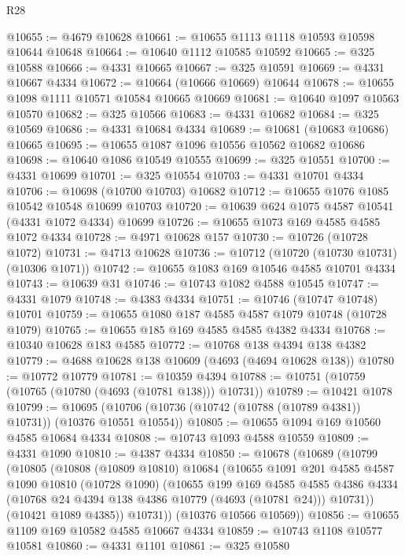 \begin{lexlean}{R28}
\begin{coremodule}
@10655 := @4679 @10628
@10661 := @10655 @1113 @1118 @10593 @10598 @10644 @10648
@10664 := @10640 @1112 @10585 @10592
@10665 := @325 @10588
@10666 := @4331 @10665
@10667 := @325 @10591
@10669 := @4331 @10667 @4334
@10672 := @10664 (@10666 @10669) @10644
@10678 := @10655 @1098 @1111 @10571 @10584 @10665 @10669
@10681 := @10640 @1097 @10563 @10570
@10682 := @325 @10566
@10683 := @4331 @10682
@10684 := @325 @10569
@10686 := @4331 @10684 @4334
@10689 := @10681 (@10683 @10686) @10665
@10695 := @10655 @1087 @1096 @10556 @10562 @10682 @10686
@10698 := @10640 @1086 @10549 @10555
@10699 := @325 @10551
@10700 := @4331 @10699
@10701 := @325 @10554
@10703 := @4331 @10701 @4334
@10706 := @10698 (@10700 @10703) @10682
@10712 := @10655 @1076 @1085 @10542 @10548 @10699 @10703
@10720 := @10639 @624 @1075 @4587 @10541 (@4331 @1072 @4334) @10699
@10726 := @10655 @1073 @169 @4585 @4585 @1072 @4334
@10728 := @4971 @10628 @157
@10730 := @10726 (@10728 @1072)
@10731 := @4713 @10628
@10736 := @10712 (@10720 (@10730 @10731) (@10306 @1071))
@10742 := @10655 @1083 @169 @10546 @4585 @10701 @4334
@10743 := @10639 @31
@10746 := @10743 @1082 @4588 @10545
@10747 := @4331 @1079
@10748 := @4383 @4334
@10751 := @10746 (@10747 @10748) @10701
@10759 := @10655 @1080 @187 @4585 @4587 @1079 @10748 (@10728 @1079)
@10765 := @10655 @185 @169 @4585 @4585 @4382 @4334
@10768 := @10340 @10628 @183 @4585
@10772 := @10768 @138 @4394 @138 @4382
@10779 := @4688 @10628 @138 @10609 (@4693 (@4694 @10628 @138))
@10780 := @10772 @10779
@10781 := @10359 @4394
@10788 := @10751 (@10759 (@10765 (@10780 (@4693 (@10781 @138))) @10731))
@10789 := @10421 @1078
@10799 := @10695 (@10706 (@10736 (@10742 (@10788 (@10789 @4381)) @10731)) (@10376 @10551 @10554))
@10805 := @10655 @1094 @169 @10560 @4585 @10684 @4334
@10808 := @10743 @1093 @4588 @10559
@10809 := @4331 @1090
@10810 := @4387 @4334
@10850 := @10678
    (@10689
      (@10799
        (@10805
          (@10808
            (@10809 @10810)
            @10684
            (@10655
              @1091
              @201
              @4585
              @4587
              @1090
              @10810
              (@10728 @1090)
              (@10655
                @199
                @169
                @4585
                @4585
                @4386
                @4334
                (@10768 @24 @4394 @138 @4386 @10779 (@4693 (@10781 @24)))
                @10731))
            (@10421 @1089 @4385))
          @10731))
      (@10376 @10566 @10569))
@10856 := @10655 @1109 @169 @10582 @4585 @10667 @4334
@10859 := @10743 @1108 @10577 @10581
@10860 := @4331 @1101
@10861 := @325 @10580

\end{coremodule}
\end{lexlean}
